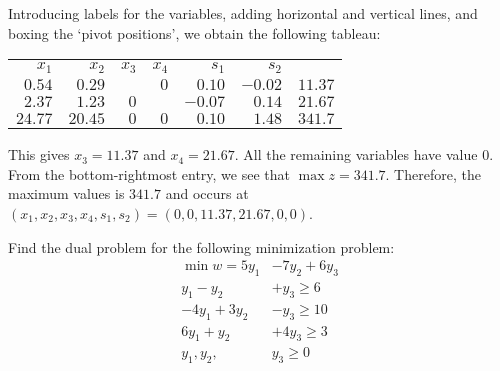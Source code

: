 \documentclass[12pt,letterpaper]{exam}
\begin{document}
\begin{questions}
Introducing labels for the variables, adding horizontal and vertical lines, and boxing the `pivot positions', we obtain the following tableau: \par
	\begin{table}[!ht]
	\centering
	\begin{tabular}{rrrrrrr}
	{\footnotesize $x_1$} & {\footnotesize $x_2$} & {\footnotesize $x_3$} & {\footnotesize $x_4$} & {\footnotesize $s_1$} & {\footnotesize $s_2$} & \\
	$0.54$ & $0.29$ & \boxed{$1$} & $0$ & $0.10$ & \multicolumn{1}{r|}{$-0.02$} & $11.37$ \\
	$2.37$ & $1.23$ & $0$ & \boxed{$1$} & $-0.07$ & \multicolumn{1}{r|}{$0.14$} & $21.67$ \\ \hline
	$24.77$ & $20.45$ & $0$ & $0$& $0.10$ & \multicolumn{1}{r|}{$1.48$} & $341.7$
	\end{tabular}
	\end{table} \par

This gives $x_3= 11.37$ and $x_4= 21.67$. All the remaining variables have value $0$. From the bottom-rightmost entry, we see that $\max z= 341.7$. Therefore, the maximum values is $341.7$ and occurs at $(x_1, x_2, x_3, x_4, s_1, s_2)= (0, 0, 11.37, 21.67, 0, 0)$. 



\newpage
\question[10] Find the dual problem for the following minimization problem:
	\[
	\begin{aligned}
	\min w= 5y_1 &- 7y_2 + 6y_3 \\
	y_1 - y_2 &+ y_3 \geq 6 \\
	-4y_1 + 3y_2 &- y_3 \geq 10 \\
	6y_1 + y_2 &+ 4y_3 \geq 3 \\
	y_1, y_2, \,&y_3 \geq 0
	\end{aligned}
	\] \pspace


\end{questions}
\end{document}
